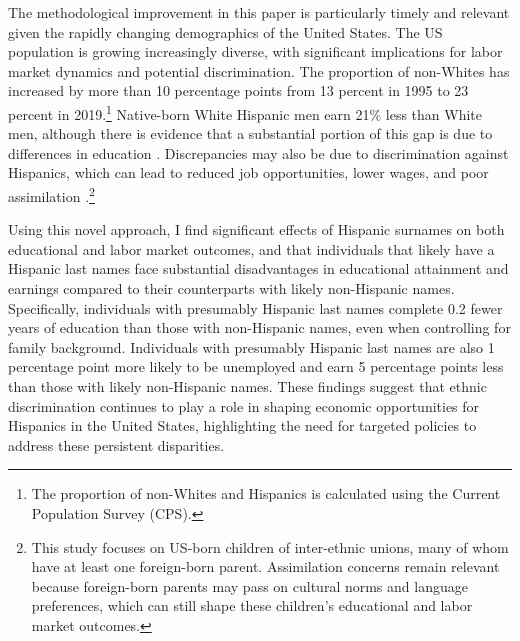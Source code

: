 The methodological improvement in this paper is particularly timely and relevant given the rapidly changing demographics of the United States. The US population is growing increasingly diverse, with significant implications for labor market dynamics and potential discrimination. The proportion of non-Whites has increased by more than 10 percentage points from 13 percent in 1995 to 23 percent in 2019.\footnote{The proportion of non-Whites and Hispanics is calculated using the Current Population Survey (CPS).} Native-born White Hispanic men earn 21\% less than White men, although there is evidence that a substantial portion of this gap is due to differences in education \autocite{duncan2006hispanics, duncan2018identifying, duncan2018socioeconomic}. Discrepancies may also be due to discrimination against Hispanics, which can lead to reduced job opportunities, lower wages, and poor assimilation \autocite{chettyWhereLandOpportunity2014,bowles2002inheritance, djajic2003assimilation}.\footnote{This study focuses on US-born children of inter-ethnic unions, many of whom have at least one foreign-born parent. Assimilation concerns remain relevant because foreign-born parents may pass on cultural norms and language preferences, which can still shape these children's educational and labor market outcomes.}

Using this novel approach, I find significant effects of Hispanic surnames on both educational and labor market outcomes, and that individuals that likely have a Hispanic last names face substantial disadvantages in educational attainment and earnings compared to their counterparts with likely non-Hispanic names. Specifically, individuals with presumably Hispanic last names complete 0.2 fewer years of education than those with non-Hispanic names, even when controlling for family background. Individuals with presumably Hispanic last names are also 1 percentage point more likely to be unemployed and earn 5 percentage points less than those with likely non-Hispanic names. These findings suggest that ethnic discrimination continues to play a role in shaping economic opportunities for Hispanics in the United States, highlighting the need for targeted policies to address these persistent disparities.

